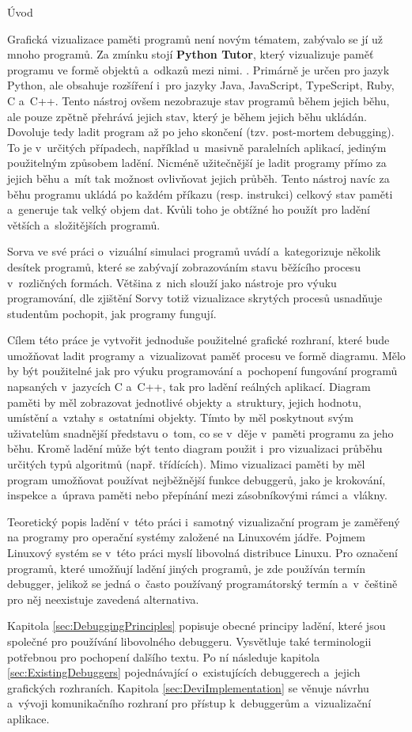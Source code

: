 \documentclass[czech,bachelor,male,python,dept460,hidelinks]{diploma}						%
\newcommand{\parspace}[1][]{
	\ifthenelse{\isempty{#1}}{\vspace{0mm}}{\vspace{#1}}
	\par
}
\begin{document}
\begin{section}{Úvod}
	\parspace Grafická vizualizace paměti programů není novým tématem, zabývalo se jí už mnoho programů. Za zmínku stojí \textbf{Python Tutor}, který vizualizuje
	paměť programu ve formě objektů a~odkazů mezi nimi. \cite{GuoSIGCSE2013}.
	Primárně je určen pro jazyk Python, ale obsahuje rozšíření i~pro jazyky Java, JavaScript, TypeScript, Ruby, C a~C++.
	Tento nástroj ovšem nezobrazuje stav programů během jejich běhu, ale pouze zpětně přehrává jejich stav, který je během jejich běhu ukládán.
	Dovoluje tedy ladit program až po jeho skončení (tzv. post-mortem debugging). To je v~určitých případech, například u~masivně
	paralelních aplikací, jediným použitelným způsobem ladění. Nicméně užitečnější je ladit programy přímo za jejich běhu a~mít
	tak možnost ovlivňovat jejich průběh. Tento nástroj navíc za běhu programu ukládá po každém příkazu (resp. instrukci) celkový stav paměti
	a~generuje tak velký objem dat. Kvůli toho je obtížné ho použít pro ladění větších a~složitějších programů.
	
	\parspace Sorva \cite[140]{sorva2012visual} ve své práci o~vizuální simulaci programů uvádí a~kategorizuje několik desítek programů,
	které se zabývají zobrazováním stavu běžícího procesu v~rozličných formách. Většina z~nich slouží jako nástroje pro výuku programování,
	dle zjištění Sorvy totiž vizualizace skrytých procesů usnadňuje studentům pochopit, jak programy fungují. \cite[212]{sorva2012visual}
	
	\parspace Cílem této práce je vytvořit jednoduše použitelné grafické rozhraní, které bude umožňovat ladit programy a~vizualizovat paměť procesu
	ve formě diagramu. Mělo by být použitelné jak pro výuku programování a~pochopení fungování programů napsaných v~jazycích C a~C++, tak pro ladění reálných
	aplikací. Diagram paměti by měl zobrazovat jednotlivé objekty a~struktury, jejich hodnotu, umístění a~vztahy s~ostatními objekty.
	Tímto by měl poskytnout svým uživatelům snadnější představu o~tom, co se v~děje v~paměti programu za jeho běhu.
	Kromě ladění může být tento diagram použit i~pro vizualizaci průběhu určitých typů algoritmů (např. třídících). Mimo vizualizaci paměti by měl program
	umožňovat používat nejběžnější funkce debuggerů, jako je krokování, inspekce a~úprava paměti nebo přepínání mezi zásobníkovými rámci a~vlákny.
	
	\parspace Teoretický popis ladění v~této práci i~samotný vizualizační program je zaměřený na programy pro operační systémy založené na Linuxovém jádře.
	Pojmem Linuxový systém se v~této práci myslí libovolná distribuce Linuxu. Pro označení programů, které umožňují ladění jiných programů,
	je zde používán termín debugger, jelikož se jedná o~často používaný programátorský termín a~v~češtině pro něj neexistuje zavedená alternativa.

	\parspace Kapitola \ref{sec:DebuggingPrinciples} popisuje obecné principy ladění, které jsou společné pro používání libovolného debuggeru.
	Vysvětluje také terminologii potřebnou pro pochopení dalšího textu. Po ní následuje kapitola \ref{sec:ExistingDebuggers} pojednávající o~existujících
	debuggerech a~jejich grafických rozhraních. Kapitola \ref{sec:DeviImplementation} se věnuje návrhu a~vývoji komunikačního rozhraní pro přístup k~debuggerům
	a~vizualizační aplikace.
\end{section}
\end{document}

